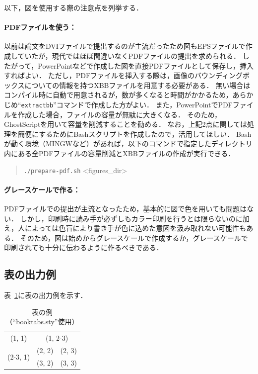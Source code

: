 \documentclass{ipsj}
\newcommand{\Tab}[1]{表~#1}
\begin{document}
  以下，図を使用する際の注意点を列挙する．
  
    \paragraph{PDFファイルを使う：}
    以前は論文をDVIファイルで提出するのが主流だったため図もEPSファイルで作成していたが，現代ではほぼ間違いなくPDFファイルの提出を求められる．
    したがって，PowerPointなどで作成した図を直接PDFファイルとして保存し，挿入すればよい．
    ただし，PDFファイルを挿入する際は，画像のバウンディングボックスについての情報を持つXBBファイルを用意する必要がある．
    無い場合はコンパイル時に自動で用意されるが，数が多くなると時間がかかるため，あらかじめ``\texttt{extractbb}''コマンドで作成した方がよい．
    また，PowerPointでPDFファイルを作成した場合，ファイルの容量が無駄に大きくなる．
    そのため，GhostScriptを用いて容量を削減することを勧める．
    なお，上記2点に関しては処理を簡便にするためにBashスクリプトを作成したので，活用してほしい．
    Bashが動く環境（MINGWなど）があれば，以下のコマンドで指定したディレクトリ内にある全PDFファイルの容量削減とXBBファイルの作成が実行できる．
      \begin{quote}
      \texttt{./prepare-pdf.sh} <figures\_dir>
      \end{quote}
    
    \paragraph{グレースケールで作る：}
    PDFファイルでの提出が主流となったため，基本的に図で色を用いても問題はない．
    しかし，印刷時に読み手が必ずしもカラー印刷を行うとは限らないのに加え，人によっては色盲により書き手が色に込めた意図を汲み取れない可能性もある．
    そのため，図は始めからグレースケールで作成するか，グレースケールで印刷されても十分に伝わるように作るべきである．
    
  \subsection{表の出力例}
  \Tab{\ref{tab:sample}}に表の出力例を示す．
  
    \begin{table}[t]
    \caption{表の例（``booktabs.sty''使用）}
    \label{tab:sample}
    \centering \small
      \begin{tabular}{ccc}
      \toprule
      (1, 1) & \multicolumn{2}{c}{(1, 2-3)} \\
      \cmidrule(r){1-1}\cmidrule(l){2-3}
      \multirow{2}{*}{(2-3, 1)} & (2, 2) & (2, 3) \\
      & (3, 2) & (3, 3) \\
      \bottomrule
      \end{tabular}
    \end{table}
  
\end{document}
